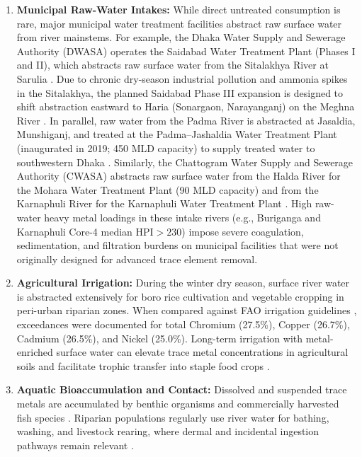 \documentclass[authoryear,preprint,12pt]{elsarticle}
\begin{document}
\begin{enumerate}
    \item \textbf{Municipal Raw-Water Intakes:} While direct untreated consumption is rare, major municipal water treatment facilities abstract raw surface water from river mainstems. For example, the Dhaka Water Supply and Sewerage Authority (DWASA) operates the Saidabad Water Treatment Plant (Phases I and II), which abstracts raw surface water from the Sitalakhya River at Sarulia \citep{DWASA2020}. Due to chronic dry-season industrial pollution and ammonia spikes in the Sitalakhya, the planned Saidabad Phase III expansion is designed to shift abstraction eastward to Haria (Sonargaon, Narayanganj) on the Meghna River \citep{DWASA2020}. In parallel, raw water from the Padma River is abstracted at Jasaldia, Munshiganj, and treated at the Padma--Jashaldia Water Treatment Plant (inaugurated in 2019; 450 MLD capacity) to supply treated water to southwestern Dhaka \citep{DWASA2020}. Similarly, the Chattogram Water Supply and Sewerage Authority (CWASA) abstracts raw surface water from the Halda River for the Mohara Water Treatment Plant (90 MLD capacity) and from the Karnaphuli River for the Karnaphuli Water Treatment Plant \citep{Khatun2021}. High raw-water heavy metal loadings in these intake rivers (e.g., Buriganga and Karnaphuli Core-4 median $\mathrm{HPI} > 230$) impose severe coagulation, sedimentation, and filtration burdens on municipal facilities that were not originally designed for advanced trace element removal.
    \item \textbf{Agricultural Irrigation:} During the winter dry season, surface river water is abstracted extensively for boro rice cultivation and vegetable cropping in peri-urban riparian zones. When compared against FAO irrigation guidelines \citep{FAO1985}, exceedances were documented for total Chromium (27.5\%), Copper (26.7\%), Cadmium (26.5\%), and Nickel (25.0\%). Long-term irrigation with metal-enriched surface water can elevate trace metal concentrations in agricultural soils and facilitate trophic transfer into staple food crops \citep{Ali2021,Islam2015}.
    \item \textbf{Aquatic Bioaccumulation and Contact:} Dissolved and suspended trace metals are accumulated by benthic organisms and commercially harvested fish species \citep{Hossain2021,Mortuza2024}. Riparian populations regularly use river water for bathing, washing, and livestock rearing, where dermal and incidental ingestion pathways remain relevant \citep{Saha2017}.
\end{enumerate}
\end{document}
